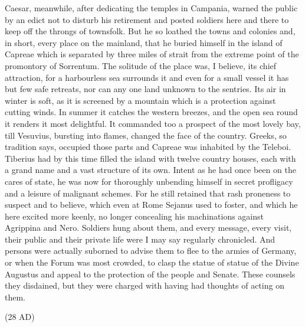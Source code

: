 
Caesar, meanwhile, after dedicating the temples in Campania, warned the public by an edict not to disturb his retirement and posted soldiers here and there to keep off the throngs of townsfolk. But he so loathed the towns and colonies and, in short, every place on the mainland, that he buried himself in the island of Capreae which is separated by three miles of strait from the extreme point of the promontory of Sorrentum. The solitude of the place was, I believe, its chief attraction, for a harbourless sea surrounds it and even for a small vessel it has but few safe retreats, nor can any one land unknown to the sentries. Its air in winter is soft, as it is screened by a mountain which is a protection against cutting winds. In summer it catches the western breezes, and the open sea round it renders it most delightful. It commanded too a prospect of the most lovely bay, till Vesuvius, bursting into flames, changed the face of the country. Greeks, so tradition says, occupied those parts and Capreae was inhabited by the Teleboi. Tiberius had by this time filled the island with twelve country houses, each with a grand name and a vast structure of its own. Intent as he had once been on the cares of state, he was now for thoroughly unbending himself in secret profligacy and a leisure of malignant schemes. For he still retained that rash proneness to suspect and to believe, which even at Rome Sejanus used to foster, and which he here excited more keenly, no longer concealing his machinations against Agrippina and Nero. Soldiers hung about them, and every message, every visit, their public and their private life were I may say regularly chronicled. And persons were actually suborned to advise them to flee to the armies of Germany, or when the Forum was most crowded, to clasp the statue of statue of the Divine Augustus and appeal to the protection of the people and Senate. These counsels they disdained, but they were charged with having had thoughts of acting on them.


(28 AD)

